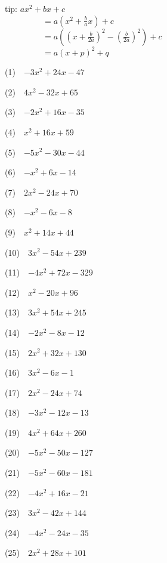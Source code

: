 \documentclass[a4j,twocolumn,10pt,fleqn]{jarticle}
\begin{document}
tip: $ax^2 + bx + c$\\ 
~~~~~~~~~$= a(x^2 + \frac{b}{a}x) + c$\\ 
~~~~~~~~~$= a\left((x + \frac{b}{2a})^2 - \left(\frac{b}{2a}\right)^2 \right)+ c$\\ 
~~~~~~~~~$= a(x + p)^2 + q$


(1)~~$-3x^2 +24x-47$

(2)~~$4x^2-32x +65$

(3)~~$-2x^2 +16x-35$

(4)~~$x^2 +16x +59$

(5)~~$-5x^2-30x-44$

(6)~~$-x^2 +6x-14$

(7)~~$2x^2-24x +70$

(8)~~$-x^2-6x-8$

(9)~~$x^2 +14x +44$

(10)~~$3x^2-54x +239$

(11)~~$-4x^2 +72x-329$

(12)~~$x^2-20x +96$

(13)~~$3x^2 +54x +245$

(14)~~$-2x^2-8x-12$

(15)~~$2x^2 +32x +130$

(16)~~$3x^2-6x-1$

(17)~~$2x^2-24x +74$

(18)~~$-3x^2-12x-13$

(19)~~$4x^2 +64x +260$

(20)~~$-5x^2-50x-127$

(21)~~$-5x^2-60x-181$

(22)~~$-4x^2 +16x-21$

(23)~~$3x^2-42x +144$

(24)~~$-4x^2-24x-35$

(25)~~$2x^2 +28x +101$
\end{document}
